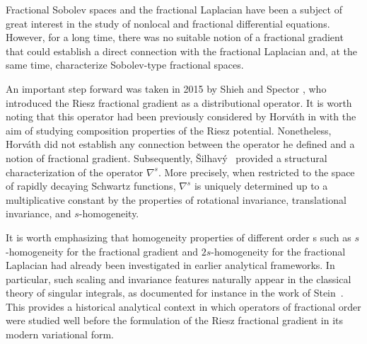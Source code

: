 \documentclass[]{amsart}
\theoremstyle{definition}
\theoremstyle{definition}
\theoremstyle{remark}
\numberwithin{equation}{section}
\newcommand{\grads}{\nabla^{s}}
\begin{document}
Fractional Sobolev spaces and the fractional Laplacian have been a subject of great interest in the study of nonlocal and fractional differential equations. However, for a long time, there was no suitable notion of a fractional gradient that could establish a direct connection with the fractional Laplacian and, at the same time, characterize Sobolev-type fractional spaces.

An important step forward was taken in 2015 by Shieh and Spector  \cite{shieh2015new}, who introduced the Riesz fractional gradient as a distributional operator. It is worth noting that this operator had been previously considered by Horváth in \cite{horvath1959some} with the aim of studying composition properties of the Riesz potential. Nonetheless, Horváth did not establish any connection between the operator he defined and a notion of fractional gradient.  Subsequently, \v{S}ilhav\'y~\cite{vsilhavyfractional} provided a structural characterization of the operator \(\grads \). More precisely, when restricted to the space of rapidly decaying Schwartz functions, \(\grads\) is uniquely determined up to a multiplicative constant by the properties of rotational invariance, translational invariance, and \(s\)-homogeneity.

It is worth emphasizing that homogeneity properties of different order s such as \(s\)-homogeneity for the fractional gradient and \(2s\)-homogeneity for the fractional Laplacian had already been investigated in earlier analytical frameworks. In particular, such scaling and invariance features naturally appear in the classical theory of singular integrals, as documented for instance in the work of Stein~\cite{stein1970singular}. This provides a historical analytical context in which operators of fractional order were studied well before the formulation of the Riesz fractional gradient in its modern variational form.
	
\end{document}
